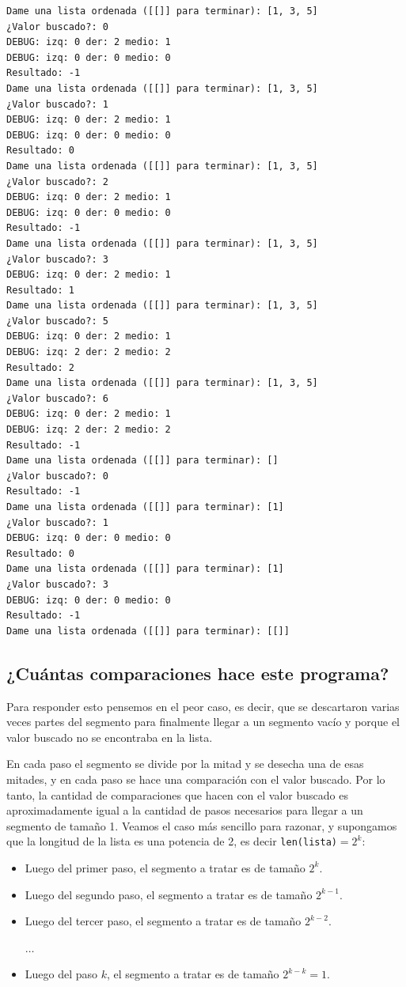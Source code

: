 \begin{verbatim}
Dame una lista ordenada ([[]] para terminar): [1, 3, 5]
¿Valor buscado?: 0
DEBUG: izq: 0 der: 2 medio: 1
DEBUG: izq: 0 der: 0 medio: 0
Resultado: -1
Dame una lista ordenada ([[]] para terminar): [1, 3, 5]
¿Valor buscado?: 1
DEBUG: izq: 0 der: 2 medio: 1
DEBUG: izq: 0 der: 0 medio: 0
Resultado: 0
Dame una lista ordenada ([[]] para terminar): [1, 3, 5]
¿Valor buscado?: 2
DEBUG: izq: 0 der: 2 medio: 1
DEBUG: izq: 0 der: 0 medio: 0
Resultado: -1
Dame una lista ordenada ([[]] para terminar): [1, 3, 5]
¿Valor buscado?: 3
DEBUG: izq: 0 der: 2 medio: 1
Resultado: 1
Dame una lista ordenada ([[]] para terminar): [1, 3, 5]
¿Valor buscado?: 5
DEBUG: izq: 0 der: 2 medio: 1
DEBUG: izq: 2 der: 2 medio: 2
Resultado: 2
Dame una lista ordenada ([[]] para terminar): [1, 3, 5]
¿Valor buscado?: 6
DEBUG: izq: 0 der: 2 medio: 1
DEBUG: izq: 2 der: 2 medio: 2
Resultado: -1
Dame una lista ordenada ([[]] para terminar): []
¿Valor buscado?: 0
Resultado: -1
Dame una lista ordenada ([[]] para terminar): [1]
¿Valor buscado?: 1
DEBUG: izq: 0 der: 0 medio: 0
Resultado: 0
Dame una lista ordenada ([[]] para terminar): [1]
¿Valor buscado?: 3
DEBUG: izq: 0 der: 0 medio: 0
Resultado: -1
Dame una lista ordenada ([[]] para terminar): [[]]
\end{verbatim}

\subsection*{¿Cuántas comparaciones hace este programa?}

Para responder esto pensemos en el peor caso, es decir, que se descartaron
varias veces partes del segmento para finalmente llegar a un segmento vacío y
porque el valor buscado no se encontraba en la lista.

En cada paso el segmento se divide por la mitad y se desecha una de esas
mitades, y en cada paso se hace una comparación con el valor buscado. Por lo
tanto, la cantidad de comparaciones que hacen con el valor buscado es
aproximadamente igual a la cantidad de pasos necesarios para llegar a un
segmento de tamaño 1.
Veamos el caso más sencillo para razonar, y supongamos que la longitud de la
lista es una potencia de 2, es decir \lstinline+len(lista)+$= 2^k$:

\begin{itemize}
\item Luego del primer paso, el segmento a tratar es de tamaño $2^k$.
\item Luego del segundo paso, el segmento a tratar es de tamaño $2^{k-1}$.
\item Luego del tercer paso, el segmento a tratar es de tamaño $2^{k-2}$.

$\ldots$

\item Luego del paso $k$, el segmento a tratar es de tamaño $2^{k-k}=1$.
\end{itemize}

